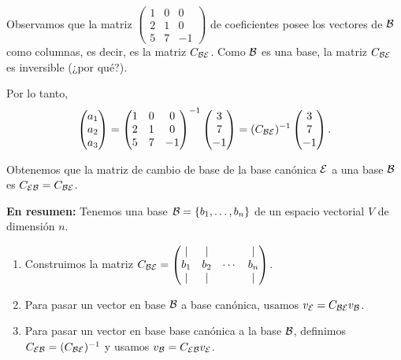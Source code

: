 Observamos que la matriz $\begin{pmatrix} 1 & 0 & 0 \\ 2 & 1 & 0 \\ 5 & 7 & -1 \end{pmatrix}$ de coeficientes posee los vectores de $\mathcal B$ como columnas, es decir, es la matriz $\Cb_{\B\E}$. Como $\mathcal B$ es una base, la matriz $\Cb_{\B\E}$ es inversible (¿por qué?).

Por lo tanto,
$$
 \begin{pmatrix} a_1 \\ a_2 \\a_3 \end{pmatrix}  = \begin{pmatrix}
1 & 0 & 0 \\
2 & 1 & 0 \\
5 & 7 & -1
\end{pmatrix}^{-1} \begin{pmatrix} 3 \\ 7 \\ -1 \end{pmatrix} = (\Cb_{\B\E})^{-1} \begin{pmatrix} 3 \\ 7 \\ -1 \end{pmatrix}.
$$

Obtenemos que la matriz de cambio de base de la base canónica $\mathcal E$ a una base $\mathcal B$ es $\Cb_{\E\B} = \Cb_{\B\E}$.

%
%

{\bf En resumen:}
Tenemos una base $\mathcal B=\{b_1, \dots, b_n\}$ de un espacio vectorial $V$ de dimensión $n$.

\begin{enumerate}
\item Construimos la matriz $\Cb_{\B\E} = \begin{pmatrix} \mid & \mid & & \mid \\ {\bb}_{1} & {\bb}_{2} & \cdots & {\bb}_{n}\\ \mid & \mid & & \mid \\ \end{pmatrix}$.
\item Para pasar un vector en base $\mathcal B$ a base canónica, usamos $\vb_\E= \Cb_{\B\E} \vb_\B$.
\item Para pasar un vector en base base canónica a la base $\mathcal B$, definimos $\Cb_{\E\B} = (\Cb_{\B\E})^{-1}$ y usamos $\vb_\B= \Cb_{\E\B} \vb_\E$.
\end{enumerate}   

